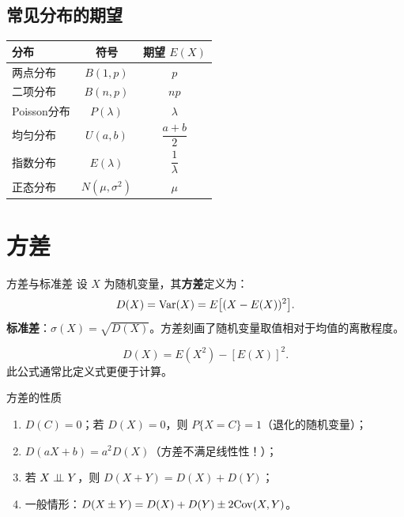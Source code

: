 \subsection{常见分布的期望}

\begin{center}
\begin{tabular}{lcc}
\toprule
\textbf{分布} & \textbf{符号} & \textbf{期望 $E(X)$} \\
\midrule
两点分布 & $B(1, p)$          & $p$ \\
二项分布 & $B(n, p)$          & $np$ \\
Poisson分布 & $P(\lambda)$   & $\lambda$ \\
均匀分布 & $U(a, b)$          & $\dfrac{a+b}{2}$ \\
指数分布 & $E(\lambda)$       & $\dfrac{1}{\lambda}$ \\
正态分布 & $N(\mu, \sigma^2)$ & $\mu$ \\
\bottomrule
\end{tabular}
\end{center}

\section{方差}

\begin{mydefinition}{方差与标准差}
	设 $X$ 为随机变量，其\textbf{方差}定义为：
	\[D(X) = \mathrm{Var}(X) = E\bigl[(X - E(X))^2\bigr].\]
	\textbf{标准差}：$\sigma(X) = \sqrt{D(X)}$。方差刻画了随机变量取值相对于均值的离散程度。
\end{mydefinition}

\begin{theorem}[方差的计算公式]
\[D(X) = E(X^2) - [E(X)]^2.\]
此公式通常比定义式更便于计算。
\end{theorem}

\begin{myproperty}{方差的性质}
\begin{enumerate}
	\item $D(C) = 0$；若 $D(X) = 0$，则 $P\{X = C\} = 1$（退化的随机变量）；
	\item $D(aX + b) = a^2 D(X)$（方差不满足线性性！）；
	\item 若 $X \perp\!\!\!\perp Y$，则 $D(X + Y) = D(X) + D(Y)$；
	\item 一般情形：$D(X \pm Y) = D(X) + D(Y) \pm 2\mathrm{Cov}(X, Y)$。
\end{enumerate}
\end{myproperty}

